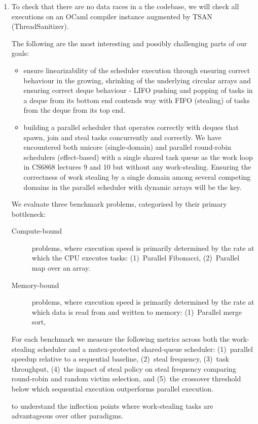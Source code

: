 \documentclass[11pt,a4paper]{article}
\begin{document}
\begin{enumerate}
   \item To check that there are no data races in a the codebase, we will check
       all executions on an OCaml compiler instance augmented by TSAN
       (ThreadSanitizer).

    The following are the most interesting and possibly challenging parts of our
    goals:
    \begin{itemize}
        \item ensure linearizability of the scheduler execution through ensuring
            correct behaviour in the growing, shrinking of the underlying circular
            arrays and ensuring correct deque behaviour - LIFO
            pushing and popping of tasks in a deque from its bottom end contends
            way with FIFO (stealing) of tasks from the deque from its top end.
        \item building a parallel scheduler that operates correctly with
            deques that spawn, join and steal tasks concurrently and
            correctly. We have encountered both unicore (single-domain) and
            parallel round-robin schedulers (effect-based) with a single shared
            task queue as the work loop in CS6868 lectures 9 and 10 but without
            any work-stealing. Ensuring the correctness of work stealing by a
            single domain among several competing domains in the parallel
            scheduler with dynamic arrays will be the key.
    \end{itemize}

    We evaluate three benchmark problems, categorised by their primary bottleneck:

    \begin{description}
      \item[Compute-bound] problems, where execution speed is primarily
      determined by the rate at which the CPU executes tasks:
      (1)~Parallel Fibonacci,
      (2)~Parallel map over an array.

      \item[Memory-bound] problems, where execution speed is primarily
      determined by the rate at which data is read from and written to memory:
      (1)~Parallel merge sort,
     \end{description}

     For each benchmark we measure the following metrics across both the
     work-stealing scheduler and a mutex-protected shared-queue scheduler:
     (1)~parallel speedup relative to a sequential baseline,
     (2)~steal frequency,
     (3)~task throughput,
     (4)~the impact of steal policy on steal frequency comparing round-robin
     and random victim selection, and
     (5)~the crossover threshold below which sequential execution outperforms
     parallel execution.

     to understand the inflection points where work-stealing tasks are
     advantageous over other paradigms.

\end{enumerate}
\end{document}
